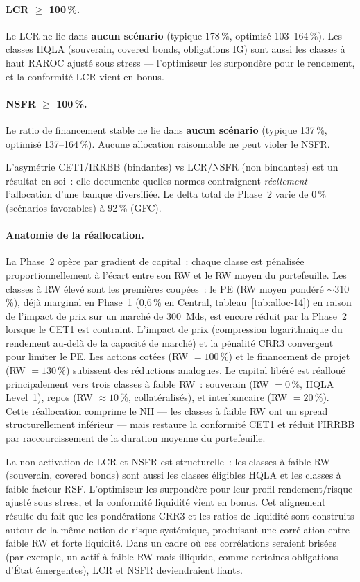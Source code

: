 \documentclass[10pt, a4paper, oneside]{report}
\theoremstyle{definition}
\begin{document}
\paragraph{LCR $\geq$ 100\,\%.} Le LCR ne lie dans \textbf{aucun scénario} (typique 178\,\%, optimisé 103--164\,\%). Les classes HQLA (souverain, covered bonds, obligations IG) sont aussi les classes à haut RAROC ajusté sous stress --- l'optimiseur les surpondère pour le rendement, et la conformité LCR vient en bonus.

\paragraph{NSFR $\geq$ 100\,\%.} Le ratio de financement stable ne lie dans \textbf{aucun scénario} (typique 137\,\%, optimisé 137--164\,\%). Aucune allocation raisonnable ne peut violer le NSFR.

\medskip
L'asymétrie CET1/IRRBB (bindantes) vs LCR/NSFR (non bindantes) est un résultat en soi~: elle documente quelles normes contraignent \emph{réellement} l'allocation d'une banque diversifiée. Le delta total de Phase~2 varie de 0\,\% (scénarios favorables) à 92\,\% (GFC).

\paragraph{Anatomie de la réallocation.} La Phase~2 opère par gradient de capital~: chaque classe est pénalisée proportionnellement à l'écart entre son RW et le RW moyen du portefeuille. Les classes à RW élevé sont les premières coupées~: le PE (RW moyen pondéré $\sim$310\,\%), déjà marginal en Phase~1 (0{,}6\,\% en Central, tableau~\ref{tab:alloc-14}) en raison de l'impact de prix sur un marché de 300~Mds\texteuro, est encore réduit par la Phase~2 lorsque le CET1 est contraint. L'impact de prix (compression logarithmique du rendement au-delà de la capacité de marché) et la pénalité CRR3 convergent pour limiter le PE. Les actions cotées (RW $= 100\,\%$) et le financement de projet (RW $= 130\,\%$) subissent des réductions analogues. Le capital libéré est réalloué principalement vers trois classes à faible RW~: souverain (RW $= 0\,\%$, HQLA Level~1), repos (RW $\approx 10\,\%$, collatéralisés), et interbancaire (RW $= 20\,\%$). Cette réallocation comprime le NII --- les classes à faible RW ont un spread structurellement inférieur --- mais restaure la conformité CET1 et réduit l'IRRBB par raccourcissement de la duration moyenne du portefeuille.

La non-activation de LCR et NSFR est structurelle~: les classes à faible RW (souverain, covered bonds) sont aussi les classes éligibles HQLA et les classes à faible facteur RSF. L'optimiseur les surpondère pour leur profil rendement/risque ajusté sous stress, et la conformité liquidité vient en bonus. Cet alignement résulte du fait que les pondérations CRR3 et les ratios de liquidité sont construits autour de la même notion de risque systémique, produisant une corrélation entre faible RW et forte liquidité. Dans un cadre où ces corrélations seraient brisées (par exemple, un actif à faible RW mais illiquide, comme certaines obligations d'État émergentes), LCR et NSFR deviendraient liants.
\end{document}
